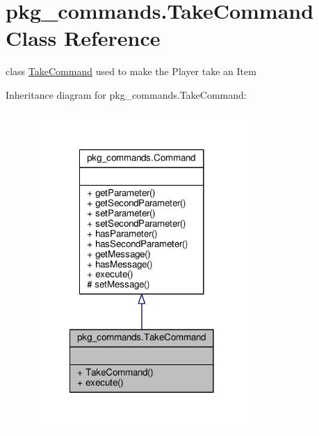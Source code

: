 \hypertarget{classpkg__commands_1_1TakeCommand}{\section{pkg\-\_\-commands.\-Take\-Command Class Reference}
\label{classpkg__commands_1_1TakeCommand}
}


class \hyperlink{classpkg__commands_1_1TakeCommand}{Take\-Command} used to make the Player take an Item  




Inheritance diagram for pkg\-\_\-commands.\-Take\-Command\-:\nopagebreak
\begin{figure}[H]
\begin{center}
\leavevmode
\includegraphics[width=234pt]{classpkg__commands_1_1TakeCommand__inherit__graph}
\end{center}
\end{figure}


